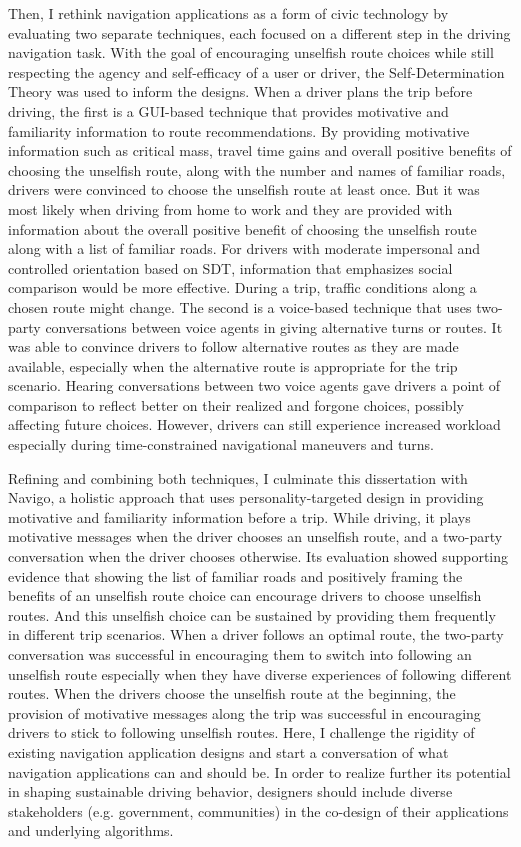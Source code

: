 Then, I rethink navigation applications as a form of civic technology by evaluating two separate techniques, each focused on a different step in the driving navigation task. With the goal of encouraging unselfish route choices while still respecting the agency and self-efficacy of a user or driver, the Self-Determination Theory was used to inform the designs. When a driver plans the trip before driving, the first is a GUI-based technique that provides motivative and familiarity information to route recommendations. By providing motivative information such as critical mass, travel time gains and overall positive benefits of choosing the unselfish route, along with the number and names of familiar roads, drivers were convinced to choose the unselfish route at least once. But it was most likely when driving from home to work and they are provided with information about the overall positive benefit of choosing the unselfish route along with a list of familiar roads. For drivers with moderate impersonal and controlled orientation based on SDT, information that emphasizes social comparison would be more effective. During a trip, traffic conditions along a chosen route might change. The second is a voice-based technique that uses two-party conversations between voice agents in giving alternative turns or routes. It was able to convince drivers to follow alternative routes as they are made available, especially when the alternative route is appropriate for the trip scenario. Hearing conversations between two voice agents gave drivers a point of comparison to reflect better on their realized and forgone choices, possibly affecting future choices. However, drivers can still experience increased workload especially during time-constrained navigational maneuvers and turns. 

Refining and combining both techniques, I culminate this dissertation with Navigo, a holistic approach that uses personality-targeted design in providing motivative and familiarity information before a trip. While driving, it plays motivative messages when the driver chooses an unselfish route, and a two-party conversation when the driver chooses otherwise. Its evaluation showed supporting evidence that showing the list of familiar roads and positively framing the benefits of an unselfish route choice can encourage drivers to choose unselfish routes. And this unselfish choice can be sustained by providing them frequently in different trip scenarios. When a driver  follows an optimal route, the two-party conversation was successful in encouraging them to switch into following an unselfish route especially when they have diverse experiences of following different routes. When the drivers choose the unselfish route at the beginning, the provision of motivative messages along the trip was successful in encouraging drivers to stick to following unselfish routes. Here, I challenge the rigidity of existing navigation application designs and start a conversation of what navigation applications can and should be. In order to realize further its potential in shaping sustainable driving behavior, designers should include diverse stakeholders (e.g. government, communities) in the co-design of their applications and underlying algorithms.

